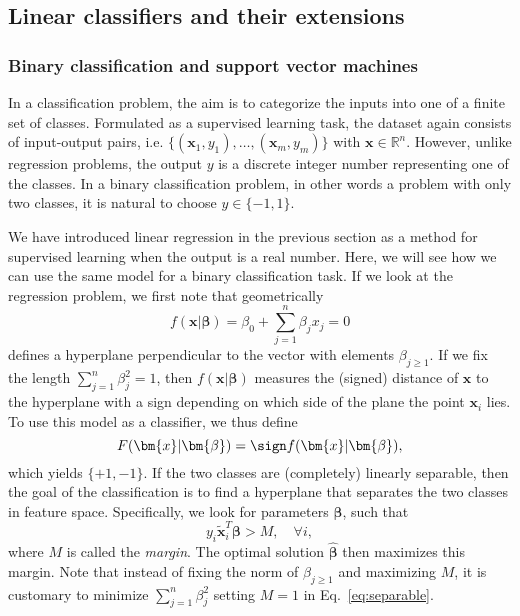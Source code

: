 \subsection{Linear classifiers and their extensions}
\subsubsection{Binary classification and support vector machines}
In a classification problem, the aim is to categorize the inputs into one of a finite set of classes. Formulated as a supervised learning task, the dataset again consists of input-output pairs, i.e. $\lbrace(\bm{x}_{1}, y_{1}), \dots, (\bm{x}_{m}, y_{m})\rbrace$ with $\bm{x}\in \mathbb{R}^n$. However, unlike regression problems, the output $y$ is a discrete integer number representing one of the classes. In a binary classification problem, in other words a problem with only two classes, it is natural to choose $y\in\{-1, 1\}$.  

We have introduced linear regression in the previous section as a method for supervised learning when the output is a real number. Here, we will see how we can use the same model for a binary classification task.
If we look at the regression problem, we first note that geometrically 
\begin{equation} \label{eqn: Univariate Linear Model B}
     f(\boldsymbol{x}|\bm{\beta}) = \beta_0 + \sum_{j=1}^{n} \beta_{j}x_{j} = 0 
\end{equation}
defines a hyperplane perpendicular to the vector with elements $\beta_{j\geq1}$. If we fix the length $\sum_{j=1}^n \beta_j^2=1$, then $f(\bm{x}|\bm{\beta})$ measures the (signed) distance of $\bm{x}$ to the hyperplane with a sign depending on which side of the plane the point $\bm{x}_i$ lies. To use this model as a classifier, we thus define
\begin{equation}
  F(\bm{x}|\bm{\beta}) = \sign f(\bm{x}|\bm{\beta}),
  \label{eq:binaryclassifier}
\end{equation}
which yields $\{+1, -1\}$.
If the two classes are (completely) linearly separable, then the goal of the classification is to find a hyperplane that separates the two classes in feature space. 
Specifically, we look for parameters $\bm{\beta}$, such that
\begin{equation}
  y_i \tilde{\bm{x}}_i^T\bm{\beta} > M, \quad \forall i,
  \label{eq:separable}
\end{equation}
where $M$ is called the \emph{margin}.
The optimal solution $\hat{\bm{\beta}}$ then maximizes this margin. Note that instead of fixing the norm of $\beta_{j\geq1}$ and maximizing $M$, it is customary to minimize $\sum_{j=1}^n \beta_j^2$ setting $M=1$ in Eq.~\eqref{eq:separable}.

